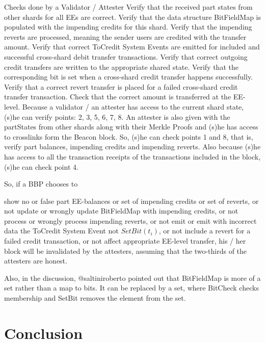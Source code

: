 \documentclass{article}
\begin{document}
Checks done by a Validator / Attester
Verify that the received part states from other shards for all EEs are correct.
Verify that the data structure BitFieldMap is populated with the impending credits for this shard.
Verify that the impending reverts are processed, meaning the sender users are credited with the transfer amount.
Verify that correct ToCredit System Events are emitted for included and successful cross-shard debit transfer transactions.
Verify that correct outgoing credit transfers are written to the appropriate shared state.
Verify that the corresponding bit is set when a cross-shard credit transfer happens successfully.
Verify that a correct revert transfer is placed for a failed cross-shard credit transfer transaction.
Check that the correct amount is transferred at the EE-level.
Because a validator / an attester has access to the current shard state, (s)he can verify points: 2, 3, 5, 6, 7, 8. An attester is also given with the partStates from other shards along with their Merkle Proofs and (s)he has access to crosslinks form the Beacon block. So, (s)he can check points 1 and 8, that is, verify part balances, impending credits and impending reverts. Also because (s)he has access to all the transaction receipts of the transactions included in the block, (s)he can check point 4.

So, if a BBP chooses to

show no or false
part EE-balances or
set of impending credits or
set of reverts, or
not update or wrongly update BitFieldMap with impending credits, or
not process or wrongly process impending reverts, or
not emit or emit with incorrect data the ToCredit System Event
not $SetBit(t_i)$, or
not include a revert for a failed credit transaction, or
not affect appropriate EE-level transfer,
his / her block will be invalidated by the attesters, assuming that the two-thirds of the attesters are honest.

Also, in the discussion, @saltiniroberto pointed out that BitFieldMap is more of a set rather than a map to bits. It can be replaced by a set, where BitCheck checks membership and SetBit removes the element from the set.

\section{Conclusion}



\end{document}
